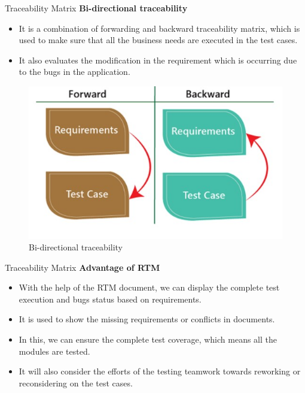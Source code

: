 \documentclass{beamer}
\begin{document}
\begin{frame}{Traceability Matrix}
	\textbf{Bi-directional traceability }
	\begin{itemize}
		\item It is a combination of forwarding and backward traceability matrix, which is used to make sure that all the business needs are executed in the test cases.
		\item It also evaluates the modification in the requirement which is occurring due to the bugs in the application.
		
		
	\end{itemize}
	\begin{figure}
		\includegraphics[scale=.5]{img/m2_15.jpg}
		\caption{Bi-directional traceability}
	\end{figure}
\end{frame}
\begin{frame}{Traceability Matrix}
	\textbf{Advantage of RTM }
	\begin{itemize}
		\item With the help of the RTM document, we can display the complete test execution and bugs status based on requirements.
		\item It is used to show the missing requirements or conflicts in documents.
		\item In this, we can ensure the complete test coverage, which means all the modules are tested.
		\item It will also consider the efforts of the testing teamwork towards reworking or reconsidering on the test cases.
	\end{itemize}
\end{frame}
\end{document}
